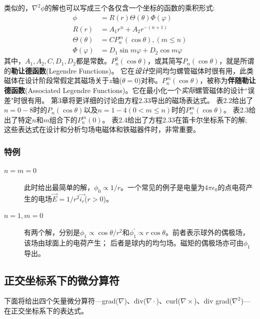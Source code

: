 类似的，$\nabla^2\phi$的解也可以写成三个各仅含一个坐标的函数的乘积形式:
\begin{subequations}
	\begin{align}
  \phi&=R(r)\Theta(\theta)\Phi(\varphi)\\
  R(r)&=A_1 r^n+A_2 r^{-(n+1)} \\
  \Theta(\theta)&=C P_n^m(\cos \theta), (m \le n) \\
  \Phi(\varphi)&=D_1 \sin m\varphi +D_2 \cos m\varphi
  	\end{align}
\end{subequations}
其中，$A_1, A_2, C, D_1, D_2$都是常数。$P_n^0(\cos \theta)$，或其简写$P_n(\cos\theta)$，就是所谓的\textbf{勒让德函数}(Legendre Functions)。
它在\textit{设计}空间均匀螺管磁体时很有用，此类磁体在设计阶段常假定其磁场关于$z$轴($\theta=0$)对称。$P_n^m(\cos\theta)$，被称为\textbf{伴随勒让德函数}(Associated Legendre Functions)。它在最小化一个\textit{实际}螺管磁体的设计``误差"时很有用。
第3章将更详细的讨论由方程2.33导出的磁场表达式。
表2.2给出了$n=0-8$时的$P_n(\cos\theta)$以及$n=1-4(0<m\le n)$时的$P_n^m(\cos\theta)$。
表2.3给出了特定$n$和$m$组合下的$P_n^m(0)$。
表2.4给出了方程2.33在笛卡尔坐标系下的解;
这些表达式在设计和分析匀场电磁体和铁磁器件时，非常重要。

\subsubsection{特例}
\begin{description}
  \item[$n=m=0$] 此时给出最简单的解，$\phi_0\propto 1/r$。一个常见的例子是电量为$4\pi\epsilon_0$的点电荷产生的电场$\vec{E}=1/r^2 \vec{i_r}$($r>0$)。
  \item[$n=1, m=0$] 有两个解，分别是$\phi_1 \propto \cos\theta /r^2$和$\phi_1^\prime\propto r\cos\theta$。前者表示球外的偶极场，该场由球面上的电荷产生；
  后者是球内的均匀场。磁矩的偶极场亦可由$\phi_1$导出。
\end{description}

\subsection{正交坐标系下的微分算符}
下面将给出四个矢量微分算符---grad($\nabla$)、div($\nabla\cdot$)、curl($\nabla\times$)、div grad($\nabla^2$)---在正交坐标系下的表达式。
